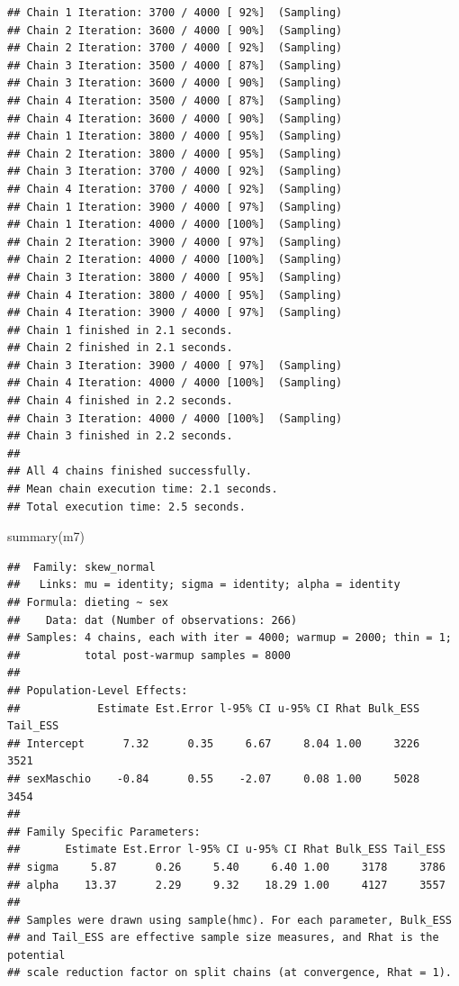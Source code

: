 \documentclass[
]{article}
\newenvironment{Shaded}{\begin{snugshade}}{\end{snugshade}}
\newcommand{\FunctionTok}[1]{\textcolor[rgb]{0.00,0.00,0.00}{#1}}
\newcommand{\NormalTok}[1]{#1}
\begin{document}
\begin{verbatim}
## Chain 1 Iteration: 3700 / 4000 [ 92%]  (Sampling) 
## Chain 2 Iteration: 3600 / 4000 [ 90%]  (Sampling) 
## Chain 2 Iteration: 3700 / 4000 [ 92%]  (Sampling) 
## Chain 3 Iteration: 3500 / 4000 [ 87%]  (Sampling) 
## Chain 3 Iteration: 3600 / 4000 [ 90%]  (Sampling) 
## Chain 4 Iteration: 3500 / 4000 [ 87%]  (Sampling) 
## Chain 4 Iteration: 3600 / 4000 [ 90%]  (Sampling) 
## Chain 1 Iteration: 3800 / 4000 [ 95%]  (Sampling) 
## Chain 2 Iteration: 3800 / 4000 [ 95%]  (Sampling) 
## Chain 3 Iteration: 3700 / 4000 [ 92%]  (Sampling) 
## Chain 4 Iteration: 3700 / 4000 [ 92%]  (Sampling) 
## Chain 1 Iteration: 3900 / 4000 [ 97%]  (Sampling) 
## Chain 1 Iteration: 4000 / 4000 [100%]  (Sampling) 
## Chain 2 Iteration: 3900 / 4000 [ 97%]  (Sampling) 
## Chain 2 Iteration: 4000 / 4000 [100%]  (Sampling) 
## Chain 3 Iteration: 3800 / 4000 [ 95%]  (Sampling) 
## Chain 4 Iteration: 3800 / 4000 [ 95%]  (Sampling) 
## Chain 4 Iteration: 3900 / 4000 [ 97%]  (Sampling) 
## Chain 1 finished in 2.1 seconds.
## Chain 2 finished in 2.1 seconds.
## Chain 3 Iteration: 3900 / 4000 [ 97%]  (Sampling) 
## Chain 4 Iteration: 4000 / 4000 [100%]  (Sampling) 
## Chain 4 finished in 2.2 seconds.
## Chain 3 Iteration: 4000 / 4000 [100%]  (Sampling) 
## Chain 3 finished in 2.2 seconds.
## 
## All 4 chains finished successfully.
## Mean chain execution time: 2.1 seconds.
## Total execution time: 2.5 seconds.
\end{verbatim}

\begin{Shaded}
\begin{Highlighting}[]
\FunctionTok{summary}\NormalTok{(m7)}
\end{Highlighting}
\end{Shaded}

\begin{verbatim}
##  Family: skew_normal 
##   Links: mu = identity; sigma = identity; alpha = identity 
## Formula: dieting ~ sex 
##    Data: dat (Number of observations: 266) 
## Samples: 4 chains, each with iter = 4000; warmup = 2000; thin = 1;
##          total post-warmup samples = 8000
## 
## Population-Level Effects: 
##            Estimate Est.Error l-95% CI u-95% CI Rhat Bulk_ESS Tail_ESS
## Intercept      7.32      0.35     6.67     8.04 1.00     3226     3521
## sexMaschio    -0.84      0.55    -2.07     0.08 1.00     5028     3454
## 
## Family Specific Parameters: 
##       Estimate Est.Error l-95% CI u-95% CI Rhat Bulk_ESS Tail_ESS
## sigma     5.87      0.26     5.40     6.40 1.00     3178     3786
## alpha    13.37      2.29     9.32    18.29 1.00     4127     3557
## 
## Samples were drawn using sample(hmc). For each parameter, Bulk_ESS
## and Tail_ESS are effective sample size measures, and Rhat is the potential
## scale reduction factor on split chains (at convergence, Rhat = 1).
\end{verbatim}
\end{document}
